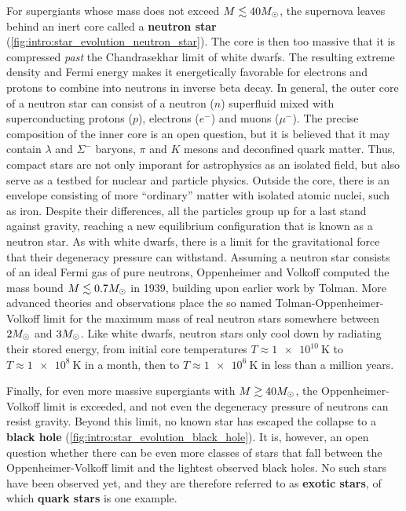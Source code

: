 For supergiants whose mass does not exceed $M \lesssim 40 M_\odot$, the supernova leaves behind an inert core called a \textbf{neutron star} (\cref{fig:intro:star_evolution_neutron_star}).
The core is then too massive that it is compressed \emph{past} the Chandrasekhar limit of white dwarfs.
The resulting extreme density and Fermi energy makes it energetically favorable for electrons and protons to combine into neutrons in inverse beta decay.
In general, the outer core of a neutron star can consist of a neutron ($n$) superfluid mixed with superconducting protons ($p$), electrons ($e^-$) and muons ($\mu^-$). %
The precise composition of the inner core is an open question, but it is believed that it may contain $\lambda$ and $\Sigma^-$ baryons, $\pi$ and $K$ mesons and deconfined quark matter. %
Thus, compact stars are not only imporant for astrophysics as an isolated field, but also serve as a testbed for nuclear and particle physics.
Outside the core, there is an envelope consisting of more ``ordinary'' matter with isolated atomic nuclei, such as iron. %
Despite their differences, all the particles group up for a last stand against gravity, reaching a new equilibrium configuration that is known as a neutron star.
As with white dwarfs, there is a limit for the gravitational force that their degeneracy pressure can withstand.
Assuming a neutron star consists of an ideal Fermi gas of pure neutrons, Oppenheimer and Volkoff computed the mass bound $M \lesssim 0.7 M_\odot$ in 1939, building upon earlier work by Tolman. \cite{ref:tov,ref:tolman}
More advanced theories and observations place the so named Tolman-Oppenheimer-Volkoff limit for the maximum mass of real neutron stars somewhere between $2 M_\odot$ and $3 M_\odot$. %
Like white dwarfs, neutron stars only cool down by radiating their stored energy, from initial core temperatures $T \approx \SI{1e10}{\kelvin}$ to $T \approx \SI{1e8}{\kelvin}$ in a month, then to $T \approx \SI{1e6}{\kelvin}$ in less than a million years. \cite{ref:glendenning} %

Finally, for even more massive supergiants with $M \gtrsim 40 M_\odot$, the Oppenheimer-Volkoff limit is exceeded, and not even the degeneracy pressure of neutrons can resist gravity.
Beyond this limit, no known star has escaped the collapse to a \textbf{black hole} (\cref{fig:intro:star_evolution_black_hole}).
It is, however, an open question whether there can be even more classes of stars that fall between the Oppenheimer-Volkoff limit and the lightest observed black holes.
No such stars have been observed yet, and they are therefore referred to as \textbf{exotic stars}, of which \textbf{quark stars} is one example.

